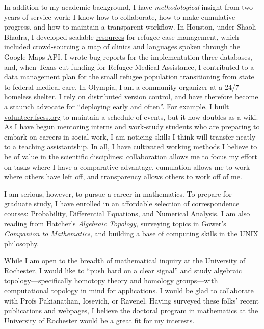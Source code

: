 \documentclass{article}
\begin{document}
In addition to my academic background, I have \emph{methodological} insight from two years of service work: I know how to collaborate, how to make cumulative progress, and how to maintain a transparent workflow. In Houston, under Shaoli Bhadra, I developed scalable \href{https://github.com/coltongrainger/ymca-resources}{resources} for refugee case management, which included crowd-sourcing a \href{https://drive.google.com/open?id=1kk9yn6-4nifHLIf2tGYbW_7PiYo\&usp=sharing}{map of clinics and languages spoken} through the Google Maps API. I wrote bug reports for the implementation three databases, and, when Texas cut funding for Refugee Medical Assistance, I contributed to a data management plan for the small refugee population transitioning from state to federal medical care. In Olympia, I am a community organizer at a 24/7 homeless shelter. I rely on distributed version control, and have therefore become a staunch advocate for ``deploying early and often''. For example, I built \mbox{\href{http://volunteer.fscss.org}{volunteer.fscss.org}} to maintain a schedule of events, but it now doubles as a wiki. As I have begun mentoring interns and work-study students who are preparing to embark on careers in social work, I am noticing skills I think will transfer neatly to a teaching assistantship. In all, I have cultivated working methods I believe to be of value in the scientific disciplines: collaboration allows me to focus my effort on tasks where I have a comparative advantage, cumulation allows me to work where others have left off, and transparency allows others to work off of me.

I am serious, however, to pursue a career in mathematics. To prepare for graduate study, I have enrolled in an affordable selection of correspondence courses: Probability, Differential Equations, and Numerical Analysis. I am also reading from Hatcher's \emph{Algebraic Topology}, surveying topics in Gower's \emph{Companion to Mathematics}, and building a base of computing skills in the UNIX philosophy.

While I am open to the breadth of mathematical inquiry at the University of Rochester, I would like to ``push hard on a clear signal'' and study algebraic topology---specifically homotopy theory and homology groups---with computational topology in mind for applications.  I would be glad to collaborate with Profs Pakianathan, Iosevich, or Ravenel. Having surveyed these folks' recent publications and webpages, I believe the doctoral program in mathematics at the University of Rochester would be a great fit for my interests.

\printbibliography
\end{document}

